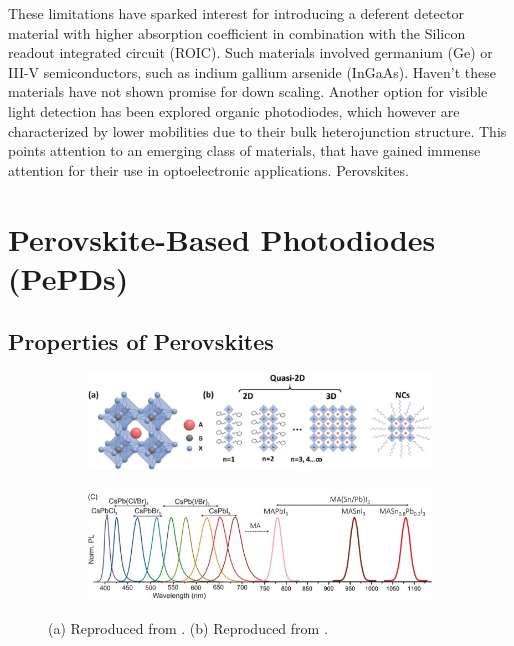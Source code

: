 
These limitations have sparked interest for introducing a deferent detector material with higher absorption coefficient in combination with the Silicon readout integrated circuit (ROIC). Such materials involved germanium (Ge) or III-V semiconductors, such as indium gallium arsenide (InGaAs). Haven't these materials have not shown promise for down scaling. Another option for visible light detection has been explored organic photodiodes, which however are characterized by lower mobilities due to their bulk heterojunction structure. This points attention to an emerging class of materials, that have gained immense attention for their use in optoelectronic applications. Perovskites. 


\section{Perovskite-Based Photodiodes (PePDs)}

\subsection{Properties of Perovskites}

\begin{figure}[htbp]
    \centering
    \begin{subfigure}[b]{\textwidth}
    \centering
        \includegraphics[width=0.85\linewidth]{chapters/introduction/image/perovskite_structure.jpg}
        \caption{}
        \label{fig:ch1:perovskite structure}
    \end{subfigure}

    \vspace{0.5cm}
    
    \begin{subfigure}[b]{\textwidth}
    \centering
        \includegraphics[width=0.85\linewidth]{chapters/introduction/image/bandgap_tunability.jpg}
        \caption{}
        \label{fig:ch1:bandgap_tunability}
    \end{subfigure}
    
    \caption{(a) Reproduced from \cite{Lei2021MetalApplications}. (b) Reproduced from \cite{Gholipour2020BandgapMaterials}.}
    \label{fig:ch1:perovskite_strucutre_bandgap}
\end{figure}

